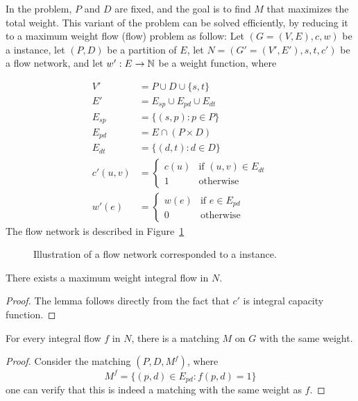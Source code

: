 \label{sub:fixed}
In the \textsc{\FIXEDCARPOOL{}} problem, $P$ and $D$ are fixed, 
and the goal is to find $M$ that maximizes the total weight. 
This variant of the problem can be solved efficiently,
by reducing it to a maximum weight flow (flow) problem as
follow:
Let $(G = (V, E), c, w)$ be a \CARPOOL{} instance,
let $(P, D)$ be a partition of $E$,
let  $N = (G' = (V', E'), s, t, c')$ be a flow network, 
and let $w' : E \rightarrow \mathbb{N}$ be a weight function, where 

\begin{align*}
V'			& = P \cup D \cup \{s, t\}										\\
E'			& = E_{sp} \cup E_{pd} \cup E_{dt}								\\
E_{sp}		& =	\{(s, p) : p \in P \}										\\
E_{pd}		& =	E \cap (P \times D)											\\
E_{dt}		& =	\{(d, t) : d \in D \}										\\
c'(u, v)	& = 
				\begin{cases}
				c(u) & \text{if } (u, v) \in E_{dt} 						\\
				1 & \text{otherwise}
				\end{cases}
																			\\
w'(e)			& = 
				\begin{cases}
				w(e) & \text{if } e \in E_{pd} 								\\
				0 & \text{otherwise}	
				\end{cases}
\end{align*}
The flow network is described in Figure~\ref{fig:flow}
\begin{figure}
\centering

\caption{
\label{fig:flow}
Illustration of a flow network corresponded to a \FIXEDCARPOOL{} instance.}
\end{figure}

\begin{lemma}
There exists a maximum weight integral flow in $N$.
\end{lemma}

\begin{proof}
The lemma follows directly from the fact that $c'$ is integral capacity function.
\end{proof}

\begin{lemma}
For every integral flow $f$ in $N$, there is a matching $M$ on $G$ with the same weight. 
\end{lemma}

\begin{proof}
Consider the matching $(P, D, M^f)$, where 
$$ M^f = \{(p, d) \in E_{pd} : f(p, d) = 1\} $$
one can verify that this is indeed a matching with the same weight as $f$.
\end{proof}

